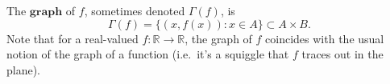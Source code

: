 \documentclass{article}
\begin{document}
The $\textbf{graph}$ of $f$, sometimes denoted $\Gamma(f)$, is 
\[\Gamma(f) = \{(x,f(x)): x \in A\} \subset A \times B.\]
Note that for a real-valued $f: \mathbb{R} \rightarrow \mathbb{R}$, the graph of $f$ coincides with the usual 
notion of the graph of a function (i.e.\ it's a squiggle that $f$ traces out in the plane).





\end{document}
